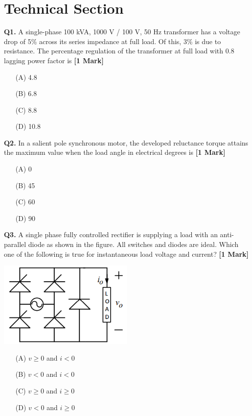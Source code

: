 \documentclass[11pt]{article}
\newcommand{\questiona}[2]{
    \noindent\textbf{Q#2.} #1 \hfill \textbf{[1 Mark]}
}
\begin{document}
\section*{Technical Section}

\questiona{A single-phase 100 kVA, 1000 V / 100 V, 50 Hz transformer has a voltage drop of 5\% across its series impedance at full load. Of this, 3\% is due to resistance. The percentage regulation of the transformer at full load with 0.8 lagging power factor is}{1}
\begin{enumerate}
    \item[(A)] 4.8
    \item[(B)] 6.8
    \item[(C)] 8.8
    \item[(D)] 10.8
\end{enumerate}
\vspace{0.5cm}

\questiona{In a salient pole synchronous motor, the developed reluctance torque attains the maximum value when the load angle in electrical degrees is}{2}
\begin{enumerate}
    \item[(A)] 0
    \item[(B)] 45
    \item[(C)] 60
    \item[(D)] 90
\end{enumerate}
\vspace{0.5cm}

\questiona{A single phase fully controlled rectifier is supplying a load with an anti-parallel diode as shown in the figure. All switches and diodes are ideal. Which one of the following is true for instantaneous load voltage and current?}{3}
\begin{center}
\includegraphics[width=0.5\textwidth]{figures/3.png}
\end{center}
\begin{enumerate}
    \item[(A)] \( v \geq 0 \) and \( i < 0 \)
    \item[(B)] \( v < 0 \) and \( i < 0 \)
    \item[(C)] \( v \geq 0 \) and \( i \geq 0 \)
    \item[(D)] \( v < 0 \) and \( i \geq 0 \)
\end{enumerate}
\vspace{0.5cm}
\end{document}

